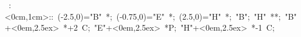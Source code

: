 \hbox{
\xy    <1cm,0cm>:<0cm,1cm>::
       (-2.5,0)="B" *{\bullet}; (-0.75,0)="E" *{\bullet}; %
       (2.5,0)="H" *{\bullet};  
       "B"; "H" **\dir{-};
       "B"+<0em,2.5ex> *{+2~C};
       "E"+<0em,2.5ex> *{P};
       "H"+<0em,2.5ex> *{-1~C};
       \endxy}
